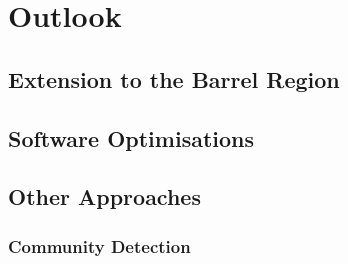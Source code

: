 

\section{Outlook}
\subsection{Extension to the Barrel Region}
\subsection{Software Optimisations}

\subsection{Other Approaches}
\subsubsection{Community Detection}




